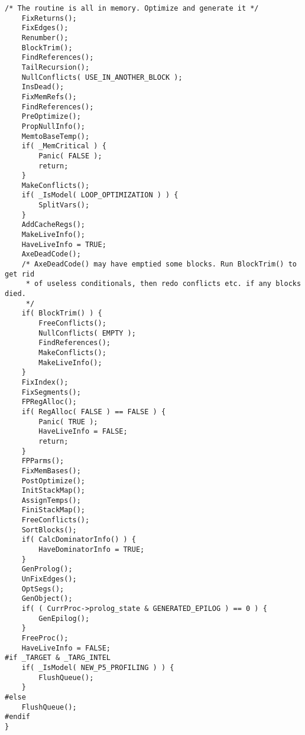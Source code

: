 \begin{lstlisting}[caption=blg\textbackslash{}cg\textbackslash{}c\textbackslash{}generate.c]
    /* The routine is all in memory. Optimize and generate it */
    FixReturns();
    FixEdges();
    Renumber();
    BlockTrim();
    FindReferences();
    TailRecursion();
    NullConflicts( USE_IN_ANOTHER_BLOCK );
    InsDead();
    FixMemRefs();
    FindReferences();
    PreOptimize();
    PropNullInfo();
    MemtoBaseTemp();
    if( _MemCritical ) {
        Panic( FALSE );
        return;
    }
    MakeConflicts();
    if( _IsModel( LOOP_OPTIMIZATION ) ) {
        SplitVars();
    }
    AddCacheRegs();
    MakeLiveInfo();
    HaveLiveInfo = TRUE;
    AxeDeadCode();
    /* AxeDeadCode() may have emptied some blocks. Run BlockTrim() to get rid
     * of useless conditionals, then redo conflicts etc. if any blocks died.
     */
    if( BlockTrim() ) {
        FreeConflicts();
        NullConflicts( EMPTY );
        FindReferences();
        MakeConflicts();
        MakeLiveInfo();
    }
    FixIndex();
    FixSegments();
    FPRegAlloc();
    if( RegAlloc( FALSE ) == FALSE ) {
        Panic( TRUE );
        HaveLiveInfo = FALSE;
        return;
    }
    FPParms();
    FixMemBases();
    PostOptimize();
    InitStackMap();
    AssignTemps();
    FiniStackMap();
    FreeConflicts();
    SortBlocks();
    if( CalcDominatorInfo() ) {
        HaveDominatorInfo = TRUE;
    }
    GenProlog();
    UnFixEdges();
    OptSegs();
    GenObject();
    if( ( CurrProc->prolog_state & GENERATED_EPILOG ) == 0 ) {
        GenEpilog();
    }
    FreeProc();
    HaveLiveInfo = FALSE;
#if _TARGET & _TARG_INTEL
    if( _IsModel( NEW_P5_PROFILING ) ) {
        FlushQueue();
    }
#else
    FlushQueue();
#endif
}
\end{lstlisting}

